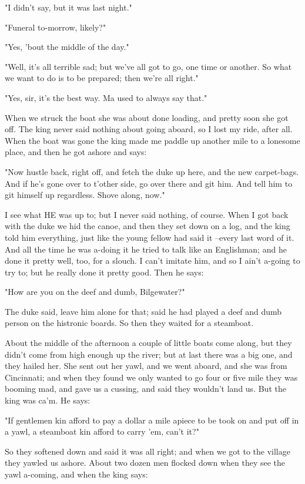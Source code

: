 "I didn't say, but it was last night."

"Funeral to-morrow, likely?"

"Yes, 'bout the middle of the day."

"Well, it's all terrible sad; but we've all got to go, one time or
another. So what we want to do is to be prepared; then we're all right."

"Yes, sir, it's the best way.  Ma used to always say that."

When we struck the boat she was about done loading, and pretty soon she
got off.  The king never said nothing about going aboard, so I lost my
ride, after all.  When the boat was gone the king made me paddle up
another mile to a lonesome place, and then he got ashore and says:

"Now hustle back, right off, and fetch the duke up here, and the new
carpet-bags.  And if he's gone over to t'other side, go over there and
git him.  And tell him to git himself up regardless.  Shove along, now."

I see what HE was up to; but I never said nothing, of course.  When I got
back with the duke we hid the canoe, and then they set down on a log, and
the king told him everything, just like the young fellow had said it
--every last word of it.  And all the time he was a-doing it he tried to
talk like an Englishman; and he done it pretty well, too, for a slouch.
I can't imitate him, and so I ain't a-going to try to; but he really done
it pretty good.  Then he says:

"How are you on the deef and dumb, Bilgewater?"

The duke said, leave him alone for that; said he had played a deef and
dumb person on the histronic boards.  So then they waited for a
steamboat.

About the middle of the afternoon a couple of little boats come along,
but they didn't come from high enough up the river; but at last there was
a big one, and they hailed her.  She sent out her yawl, and we went
aboard, and she was from Cincinnati; and when they found we only wanted
to go four or five mile they was booming mad, and gave us a cussing, and
said they wouldn't land us.  But the king was ca'm.  He says:

"If gentlemen kin afford to pay a dollar a mile apiece to be took on and
put off in a yawl, a steamboat kin afford to carry 'em, can't it?"

So they softened down and said it was all right; and when we got to the
village they yawled us ashore.  About two dozen men flocked down when
they see the yawl a-coming, and when the king says:

